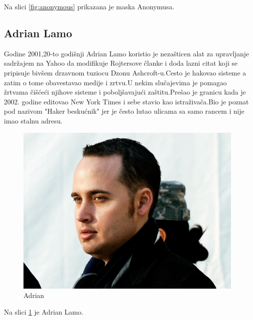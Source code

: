 \documentclass[a4paper]{article}
\begin{document}
 Na slici \ref{fig:anonymous} prikazana je maska Anonymusa. 
 
 \subsection{Adrian Lamo}
Godine 2001,20-to godišnji Adrian Lamo koristio je nezašticen alat za upravljanje sadržajem na Yahoo da modifikuje Rojtersove članke i doda lazni citat koji se pripisuje bivšem drzavnom tuziocu Dzonu Ashcroft-u.Cesto je hakovao sisteme a zatim o tome obavestavao medije i zrtvu.U nekim slučajevima je pomagao žrtvama čišćeći njihove sisteme i poboljšavajući zaštitu.Prešao je granicu kada je 2002. godine editovao New York Times i sebe stavio kao istraživača.Bio je poznat pod nazivom "Haker beskućnik" jer je često lutao ulicama sa samo rancem i nije imao stalnu adresu.
\begin{figure}[h!]
	\begin{center}
		\includegraphics[scale=0.10]{adrian.jpg}
	\end{center}
	\caption{Adrian}
	\label{fig:adrian}
\end{figure}

Na slici \ref{fig:adrian} je Adrian Lamo.

\newpage
\end{document}
